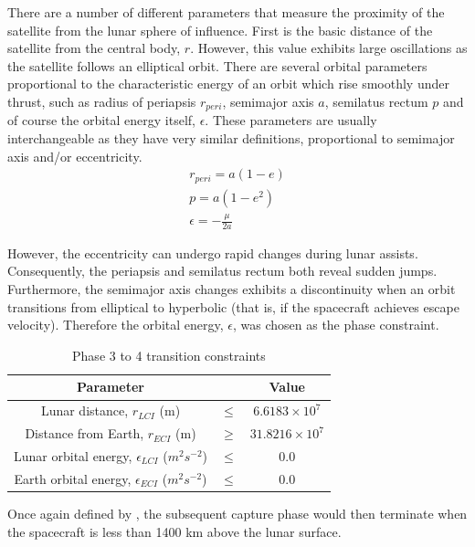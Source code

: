 There are a number of different parameters that measure the proximity of the satellite from the lunar sphere of influence. First is the basic distance of the satellite from the central body, $r$. However, this value exhibits large oscillations as the satellite follows an elliptical orbit. There are several orbital parameters proportional to the characteristic energy of an orbit which rise smoothly under thrust, such as radius of periapsis $r_{peri}$, semimajor axis $a$, semilatus rectum $p$ and of course the orbital energy itself, $\epsilon$. These parameters are usually interchangeable as they have very similar definitions, proportional to semimajor axis and/or eccentricity.
\begin{gather}
r_{peri} = a(1-e)\\
p = a(1-e^2)\\
\epsilon = -\frac{\mu}{2a}
\end{gather}

However, the eccentricity can undergo rapid changes during lunar assists. Consequently, the periapsis and semilatus rectum both reveal sudden jumps. Furthermore, the semimajor axis changes exhibits a discontinuity when an orbit transitions from elliptical to hyperbolic (that is, if the spacecraft achieves escape velocity). Therefore the orbital energy, $\epsilon$, was chosen as the phase constraint.

\begin{table}[h]
\caption{Phase 3 to 4 transition constraints}
\label{tab:Phase-3-4-constraints}
\begin{center}
\begin{tabular} {ccc}\toprule
Parameter & & Value\\\midrule
Lunar distance, $r_{LCI}$ (m) &$\le$& $6.6183\times 10^7$\\\midrule
Distance from Earth, $r_{ECI}$ (m) &$\ge$& $31.8216\times 10^7$\\\midrule
Lunar orbital energy, $\epsilon_{LCI}$ ($m^2s^{-2}$) &$\le$& 0.0 \\\midrule
Earth orbital energy, $\epsilon_{ECI}$ ($m^2s^{-2}$) &$\le$& 0.0 \\\bottomrule
\end{tabular}
\end{center}
\end{table}

Once again defined by \citeauthor{Roeser2006}, the subsequent capture phase would then terminate when the spacecraft is less than 1400 km above the lunar surface.

